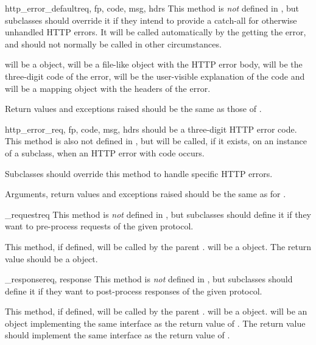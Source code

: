 \begin{methoddesc}[BaseHandler]{http_error_default}{req, fp, code, msg, hdrs}
This method is \emph{not} defined in , but
subclasses should override it if they intend to provide a catch-all
for otherwise unhandled HTTP errors.  It will be called automatically
by the   getting the error, and should not
normally be called in other circumstances.

 will be a  object,  will be a
file-like object with the HTTP error body,  will be the
three-digit code of the error,  will be the user-visible
explanation of the code and  will be a mapping object with
the headers of the error.

Return values and exceptions raised should be the same as those
of .
\end{methoddesc}

\begin{methoddesc}[BaseHandler]{http_error_}{req, fp, code, msg, hdrs}
 should be a three-digit HTTP error code.  This method is
also not defined in , but will be called, if it
exists, on an instance of a subclass, when an HTTP error with code
 occurs.

Subclasses should override this method to handle specific HTTP
errors.

Arguments, return values and exceptions raised should be the same as
for .
\end{methoddesc}

\begin{methoddescni}[BaseHandler]{_request}{req}
This method is \emph{not} defined in , but
subclasses should define it if they want to pre-process requests of
the given protocol.

This method, if defined, will be called by the parent
.   will be a  object.
The return value should be a  object.
\end{methoddescni}

\begin{methoddescni}[BaseHandler]{_response}{req, response}
This method is \emph{not} defined in , but
subclasses should define it if they want to post-process responses of
the given protocol.

This method, if defined, will be called by the parent
.   will be a  object.
 will be an object implementing the same interface as
the return value of .  The return value should
implement the same interface as the return value of
.
\end{methoddescni}

